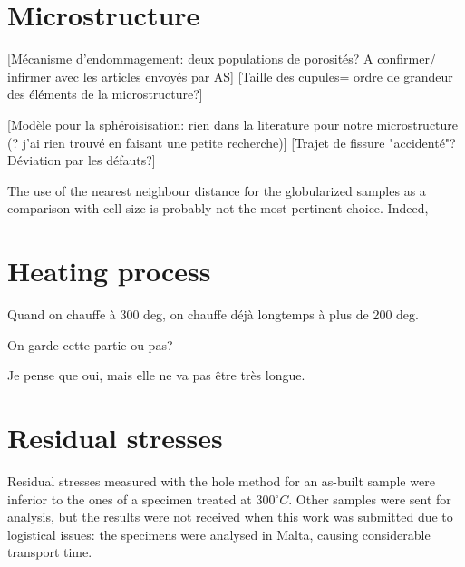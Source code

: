 \section{Microstructure}
\label{DMMM}
[Mécanisme d'endommagement: deux populations de porosités? A confirmer/ infirmer avec les articles envoyés par AS]
[Taille des cupules= ordre de grandeur des éléments de la microstructure?] 

[Modèle pour la sphéroisisation: rien dans la literature pour notre microstructure (? j'ai rien trouvé en faisant une petite recherche)]
[Trajet de fissure "accidenté"? Déviation par les défauts?]

The use of the nearest neighbour distance for the globularized samples as a comparison with cell size is probably not the most pertinent choice. Indeed, 

\section{Heating process}
Quand on chauffe à 300 deg, on chauffe déjà longtemps à plus de 200 deg.

 On garde cette partie ou pas?
 
 Je pense que oui, mais elle ne va pas être très longue.






\label{D-MP}

\section{Residual stresses}
Residual stresses measured with the hole method for an as-built sample were inferior to the ones of a specimen treated at 300$^\circ C$. Other samples were sent for analysis, but the results were not received when this work was submitted due to logistical issues: the specimens were analysed in Malta, causing considerable transport time.\\

